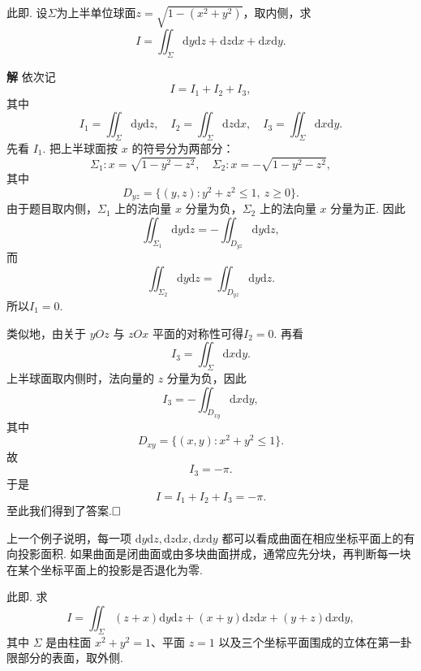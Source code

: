 \documentclass{ctexart}
\newenvironment{custom}[1]{\par\noindent \textbf{#1}\quad}{\par\vspace{1em}}
\begin{document}
\begin{example}
\label{eg:2521}
此即\cite[例题25.2.1]{XHM}. 设$\Sigma$为上半单位球面$z=\sqrt{1-(x^{2}+y^{2})}$，取内侧，求
\[
I=\iint_{\Sigma}{\mathrm{d}y\mathrm{d}z+\mathrm{d}z\mathrm{d}x+\mathrm{d}x\mathrm{d}y}.
\]
\end{example}

\begin{custom}{解}
依次记
\[
I=I_{1}+I_{2}+I_{3},
\]
其中
\[
I_{1}=\iint_{\Sigma}\mathrm{d}y\mathrm{d}z,\quad
I_{2}=\iint_{\Sigma}\mathrm{d}z\mathrm{d}x,\quad
I_{3}=\iint_{\Sigma}\mathrm{d}x\mathrm{d}y.
\]
先看 $I_{1}$. 把上半球面按 $x$ 的符号分为两部分：
\[
\Sigma_{1}:x=\sqrt{1-y^{2}-z^{2}},\quad
\Sigma_{2}:x=-\sqrt{1-y^{2}-z^{2}},
\]
其中
\[
D_{yz}=\{(y,z):y^{2}+z^{2}\leqslant 1,\ z\geqslant 0\}.
\]
由于题目取内侧，$\Sigma_{1}$ 上的法向量 $x$ 分量为负，$\Sigma_{2}$ 上的法向量 $x$ 分量为正. 因此
\[
\iint_{\Sigma_{1}}\mathrm{d}y\mathrm{d}z
=-\iint_{D_{yz}}\mathrm{d}y\mathrm{d}z,
\]
而
\[
\iint_{\Sigma_{2}}\mathrm{d}y\mathrm{d}z
=\iint_{D_{yz}}\mathrm{d}y\mathrm{d}z.
\]
所以$I_{1}=0.$

类似地，由关于 $yOz$ 与 $zOx$ 平面的对称性可得$I_{2}=0.$
再看
\[
I_{3}=\iint_{\Sigma}\mathrm{d}x\mathrm{d}y.
\]
上半球面取内侧时，法向量的 $z$ 分量为负，因此
\[
I_{3}=-\iint_{D_{xy}}\mathrm{d}x\mathrm{d}y,
\]
其中
\[
D_{xy}=\{(x,y):x^{2}+y^{2}\leqslant 1\}.
\]
故
\[
I_{3}=-\pi.
\]
于是
\[
I=I_{1}+I_{2}+I_{3}=-\pi.
\]
至此我们得到了答案.$\hfill{\square}$
\end{custom}

上一个例子说明，每一项 $\mathrm{d}y\mathrm{d}z,\mathrm{d}z\mathrm{d}x,\mathrm{d}x\mathrm{d}y$ 都可以看成曲面在相应坐标平面上的有向投影面积. 如果曲面是闭曲面或由多块曲面拼成，通常应先分块，再判断每一块在某个坐标平面上的投影是否退化为零.

\begin{example}
此即\cite[例题25.2.2]{XHM}. 求
\[
I=\iint_{\Sigma}(z+x)\mathrm{d}y\mathrm{d}z+(x+y)\mathrm{d}z\mathrm{d}x+(y+z)\mathrm{d}x\mathrm{d}y,
\]
其中 $\Sigma$ 是由柱面 $x^{2}+y^{2}=1$、平面 $z=1$ 以及三个坐标平面围成的立体在第一卦限部分的表面，取外侧.
\end{example}
\end{document}
